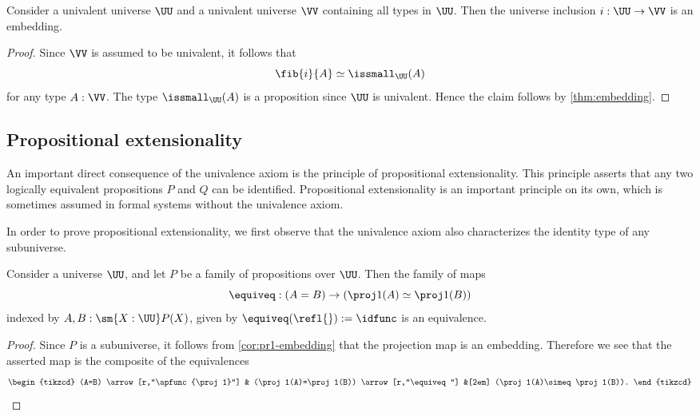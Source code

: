 \begin{cor}
  Consider a univalent universe $\UU$ and a univalent universe $\VV$ containing all types in $\UU$. Then the universe inclusion $i:\UU\to\VV$ is an embedding.
\end{cor}

\begin{proof}
  Since $\VV$ is assumed to be univalent, it follows that
  \begin{equation*}
    \fib{i}{A}\simeq\issmall_\UU(A)
  \end{equation*}
  for any type $A:\VV$. The type $\issmall_\UU(A)$ is a proposition since $\UU$ is univalent. Hence the claim follows by \cref{thm:embedding}.
\end{proof}

\subsection{Propositional extensionality}

An important direct consequence of the univalence axiom is the principle of propositional extensionality. This principle asserts that any two logically equivalent propositions $P$ and $Q$ can be identified. Propositional extensionality is an important principle on its own, which is sometimes assumed in formal systems without the univalence axiom.

In order to prove propositional extensionality, we first observe that the univalence axiom also characterizes the identity type of any subuniverse.

\begin{prp}\label{prp:univalence-subuniverse}
  Consider a universe $\UU$, and let $P$ be a family of propositions over $\UU$. Then the family of maps
  \begin{equation*}
    \equiveq:(A=B)\to (\proj 1(A) \simeq \proj 1(B))
  \end{equation*}
  indexed by $A,B:\sm{X:\UU}P(X)$, given by $\equiveq(\refl{}):=\idfunc$ is an equivalence.
\end{prp}

\begin{proof}
  Since $P$ is a subuniverse, it follows from \cref{cor:pr1-embedding} that the projection map is an embedding. Therefore we see that the asserted map is the composite of the equivalences
  \begin{equation*}
    \begin{tikzcd}
      (A=B) \arrow[r,"\apfunc{\proj 1}"] & (\proj 1(A)=\proj 1(B)) \arrow[r,"\equiveq"] &[2em] (\proj 1(A)\simeq \proj 1(B)).
    \end{tikzcd}\qedhere
  \end{equation*}
\end{proof}

